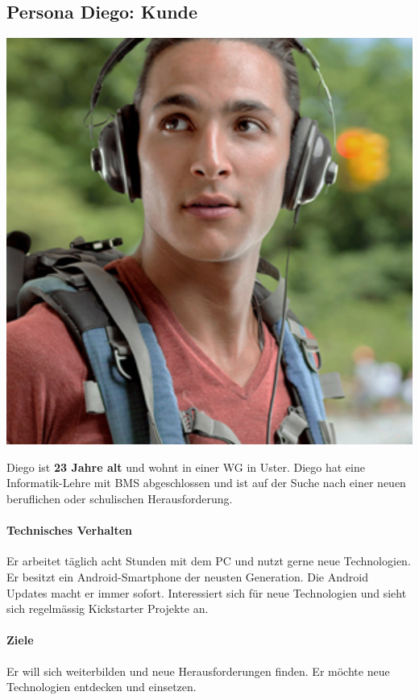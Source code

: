 \subsection{Persona Diego: Kunde}
\begin{minipage}{0.25\textwidth}%
\centering
\includegraphics[width=1.0\textwidth]{images/persona-diego.jpg}
\label{fig:diego}
\end{minipage}%
\hfill%
\begin{minipage}{0.70\textwidth}
Diego ist \textbf{23 Jahre alt} und wohnt in einer WG in Uster.
Diego hat eine Informatik-Lehre mit BMS abgeschlossen und ist auf der Suche nach einer neuen beruflichen oder schulischen Herausforderung.
\paragraph{Technisches Verhalten}
Er arbeitet täglich acht Stunden mit dem PC und nutzt gerne neue Technologien. Er besitzt ein Android-Smartphone der neusten Generation. Die Android Updates macht er immer sofort. Interessiert sich für neue Technologien und sieht sich regelmässig Kickstarter Projekte an.
\paragraph{Ziele}
Er will sich weiterbilden und neue Herausforderungen finden. Er möchte neue Technologien entdecken und einsetzen.
\end{minipage}

